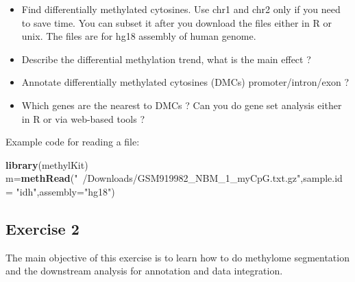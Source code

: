 \documentclass[12pt,]{krantz}
\newenvironment{Shaded}{\begin{snugshade}}{\end{snugshade}}
\newcommand{\DataTypeTok}[1]{\textcolor[rgb]{0.13,0.29,0.53}{#1}}
\newcommand{\KeywordTok}[1]{\textcolor[rgb]{0.13,0.29,0.53}{\textbf{#1}}}
\newcommand{\NormalTok}[1]{#1}
\newcommand{\StringTok}[1]{\textcolor[rgb]{0.31,0.60,0.02}{#1}}
\providecommand{\tightlist}{%
  \setlength{\itemsep}{0pt}\setlength{\parskip}{0pt}}
\begin{document}
\begin{itemize}
\tightlist
\item
  Find differentially methylated cytosines. Use chr1 and chr2 only if you need to save time. You can subset it after you download the files either in R or unix. The files are for hg18 assembly of human genome.
\item
  Describe the differential methylation trend, what is the main effect ?
\item
  Annotate differentially methylated cytosines (DMCs) promoter/intron/exon ?
\item
  Which genes are the nearest to DMCs ? Can you do gene set analysis either in R or via web-based tools ?
\end{itemize}

Example code for reading a file:

\begin{Shaded}
\begin{Highlighting}[]
\KeywordTok{library}\NormalTok{(methylKit)}
\NormalTok{m=}\KeywordTok{methRead}\NormalTok{(}\StringTok{"~/Downloads/GSM919982_NBM_1_myCpG.txt.gz"}\NormalTok{,}\DataTypeTok{sample.id =} \StringTok{"idh"}\NormalTok{,}\DataTypeTok{assembly=}\StringTok{"hg18"}\NormalTok{)}
\end{Highlighting}
\end{Shaded}

\hypertarget{exercise-2}{%
\subsection{Exercise 2}\label{exercise-2}}

The main objective of this exercise is to learn how to do methylome segmentation and the downstream analysis for annotation and data integration.
\end{document}
